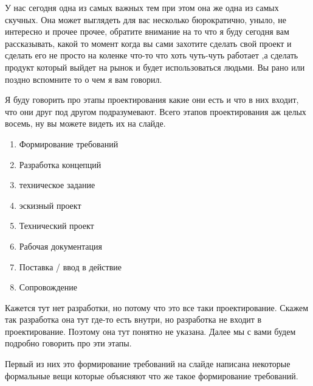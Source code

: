 
У нас сегодня одна из самых важных тем при этом она же одна из самых скучных. Она может выглядеть для вас несколько бюрократично, уныло,  не интересно и прочее прочее, обратите внимание на то что я буду сегодня вам рассказывать, какой то момент когда вы сами захотите сделать свой проект и сделать его не просто на коленке что-то что хоть чуть-чуть работает ,а сделать продукт который выйдет на рынок и будет использоваться людьми. Вы рано или поздно вспомните то о чем я вам говорил.

Я буду говорить про этапы проектирования какие они есть и что в них входит, что они друг под другом подразумевают. Всего этапов проектирования аж целых восемь, ну вы можете видеть их на слайде.

\begin{enumerate}
  \item Формирование требований
  \item Разработка концепций
  \item техническое задание
  \item эскизный проект
  \item Технический проект
  \item Рабочая документация
  \item Поставка / ввод в действие
  \item Сопровождение
\end{enumerate}

Кажется тут нет разработки, но потому что это все таки проектирование. Скажем так разработка она тут где-то есть внутри, но разработка не входит в проектирование. Поэтому она тут понятно не указана. Далее мы с вами будем подробно говорить про эти этапы.

Первый из них это формирование требований
на слайде написана некоторые формальные вещи которые объясняют что же такое формирование требований.

